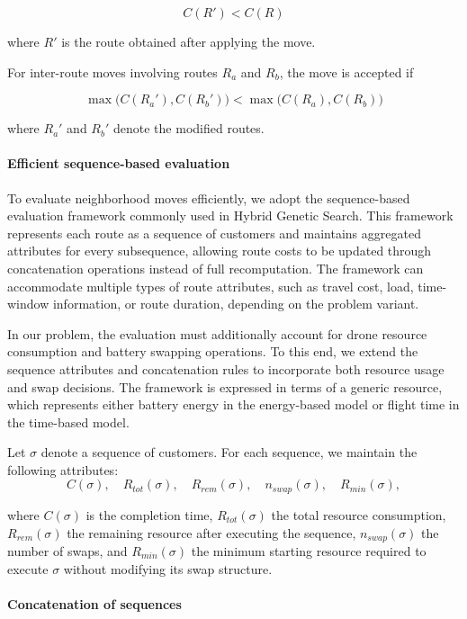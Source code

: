 \documentclass[3p, authoryear, 11pt]{elsarticle}
\begin{document}
\[
C(R') < C(R)
\]

where $R'$ is the route obtained after applying the move.

For inter-route moves involving routes $R_a$ and $R_b$, the move is accepted if

\[
\max \big(C(R_a'), C(R_b')\big)
<
\max \big(C(R_a), C(R_b)\big)
\]

where $R_a'$ and $R_b'$ denote the modified routes.

\paragraph{Efficient sequence-based evaluation}

To evaluate neighborhood moves efficiently, we adopt the sequence-based evaluation framework commonly used in Hybrid Genetic Search. 
This framework represents each route as a sequence of customers and maintains aggregated attributes for every subsequence, allowing route costs to be updated through concatenation operations instead of full recomputation. The framework can accommodate multiple types of route attributes, such as travel cost, load, time-window information, or route duration, depending on the problem variant.

In our problem, the evaluation must additionally account for drone resource consumption and battery swapping operations. 
To this end, we extend the sequence attributes and concatenation rules to incorporate both resource usage and swap decisions.
The framework is expressed in terms of a generic resource, which represents either battery energy in the energy-based model or flight time in the time-based model.

Let $\sigma$ denote a sequence of customers. 
For each sequence, we maintain the following attributes:
\[
C(\sigma), \quad
R_{tot}(\sigma), \quad
R_{rem}(\sigma), \quad
n_{swap}(\sigma), \quad
R_{min}(\sigma),
\]

where $C(\sigma)$ is the completion time, $R_{tot}(\sigma)$ the total resource consumption, 
$R_{rem}(\sigma)$ the remaining resource after executing the sequence, 
$n_{swap}(\sigma)$ the number of swaps, 
and $R_{min}(\sigma)$ the minimum starting resource required to execute $\sigma$ without modifying its swap structure.

\paragraph{Concatenation of sequences}
\end{document}

